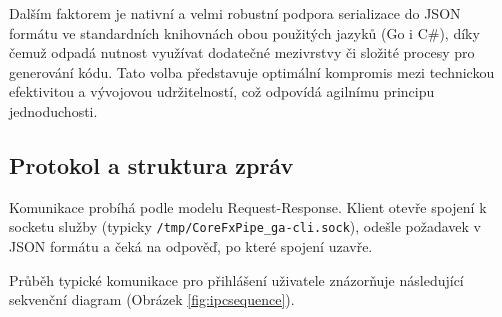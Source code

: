 Dalším faktorem je nativní a velmi robustní podpora serializace do JSON formátu ve standardních knihovnách obou použitých jazyků (Go i C\#), díky čemuž odpadá nutnost využívat dodatečné mezivrstvy či složité procesy pro generování kódu. Tato volba představuje optimální kompromis mezi technickou efektivitou a vývojovou udržitelností, což odpovídá agilnímu principu jednoduchosti.

\subsection{Protokol a struktura zpráv}
Komunikace probíhá podle modelu Request-Response. Klient otevře spojení k socketu služby (typicky \texttt{/tmp/\allowbreak{}CoreFxPipe\_ga-cli.sock}), odešle požadavek v JSON formátu a čeká na odpověď, po které spojení uzavře.

Průběh typické komunikace pro přihlášení uživatele znázorňuje následující sekvenční diagram (Obrázek \ref{fig:ipcsequence}).

